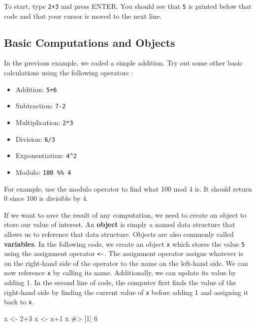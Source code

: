 \documentclass[
  letterpaper,
]{latex/krantz}
\makeatletter
\newenvironment{Shaded}{\begin{snugshade}}{\end{snugshade}}
\newcommand{\CommentTok}[1]{\textcolor[rgb]{0.37,0.37,0.37}{#1}}
\newcommand{\DecValTok}[1]{\textcolor[rgb]{0.68,0.00,0.00}{#1}}
\newcommand{\NormalTok}[1]{\textcolor[rgb]{0.00,0.23,0.31}{#1}}
\newcommand{\OtherTok}[1]{\textcolor[rgb]{0.00,0.23,0.31}{#1}}
\newcommand{\SpecialCharTok}[1]{\textcolor[rgb]{0.37,0.37,0.37}{#1}}
\providecommand{\tightlist}{%
  \setlength{\itemsep}{0pt}\setlength{\parskip}{0pt}}\usepackage{longtable,booktabs,array}
\newenvironment{kframe}{%
\medskip{}
\setlength{\fboxsep}{.8em}
 \def\at@end@of@kframe{}%
 \ifinner\ifhmode%
  \def\at@end@of@kframe{\end{minipage}}%
  \begin{minipage}{\columnwidth}%
 \fi\fi%
 \def\FrameCommand##1{\hskip\@totalleftmargin \hskip-\fboxsep
 \colorbox{shadecolor}{##1}\hskip-\fboxsep
     \hskip-\linewidth \hskip-\@totalleftmargin \hskip\columnwidth}%
 \MakeFramed {\advance\hsize-\width
   \@totalleftmargin\z@ \linewidth\hsize
   \@setminipage}}%
 {\par\unskip\endMakeFramed%
 \at@end@of@kframe}
\renewenvironment{Shaded}{\begin{kframe}}{\end{kframe}}
\makeatother
\begin{document}
To start, type \texttt{2+3} and press ENTER. You should see that
\texttt{5} is printed below that code and that your cursor is moved to
the next line.

\subsection{Basic Computations and
Objects}\label{basic-computations-and-objects}

In the previous example, we coded a simple addition. Try out some other
basic calculations using the following operators :

\begin{itemize}
\tightlist
\item
  Addition: \texttt{5+6}\\
\item
  Subtraction: \texttt{7-2}\\
\item
  Multiplication: \texttt{2*3}\\
\item
  Division: \texttt{6/3}\\
\item
  Exponentiation: \texttt{4\^{}2}\\
\item
  Modulo: \texttt{100\ \%\%\ 4}
\end{itemize}

For example, use the modulo operator to find what 100 mod 4 is. It
should return 0 since 100 is divisible by 4.

If we want to save the result of any computation, we need to create an
object to store our value of interest. An \textbf{object}
is simply a named data structure that allows us to reference that data
structure. Objects are also commonly called
\textbf{variables}. In the following code, we create an
object \texttt{x} which stores the value \texttt{5} using the assignment
operator \texttt{\textless{}-}. The
assignment operator assigns whatever is on the right-hand side of the
operator to the name on the left-hand side. We can now reference
\texttt{x} by calling its name. Additionally, we can update its value by
adding 1. In the second line of code, the computer first finds the value
of the right-hand side by finding the current value of \texttt{x} before
adding 1 and assigning it back to \texttt{x}.

\begin{Shaded}
\begin{Highlighting}[]
\NormalTok{x }\OtherTok{\textless{}{-}} \DecValTok{2}\SpecialCharTok{+}\DecValTok{3}
\NormalTok{x }\OtherTok{\textless{}{-}}\NormalTok{ x}\SpecialCharTok{+}\DecValTok{1}
\NormalTok{x}
\CommentTok{\#\textgreater{} [1] 6}
\end{Highlighting}
\end{Shaded}
\end{document}
